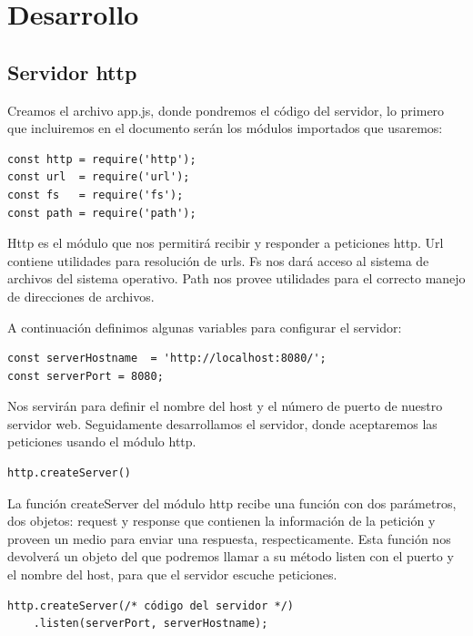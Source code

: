 \documentclass[11pt]{article}
\begin{document}
\section{Desarrollo}
\label{sec:org5755675}

\subsection{Servidor http}
\label{sec:orgc8b7765}
Creamos el archivo app.js, donde pondremos el código del servidor,
lo primero que incluiremos en el documento serán los módulos importados que usaremos:

\begin{verbatim}
const http = require('http');
const url  = require('url');
const fs   = require('fs');
const path = require('path');
\end{verbatim}

Http es el módulo que nos permitirá recibir y responder a peticiones http.
Url contiene utilidades para resolución de urls.
Fs nos dará acceso al sistema de archivos del sistema operativo.
Path nos provee utilidades para el correcto manejo de direcciones de archivos.

A continuación definimos algunas variables para configurar el servidor:

\begin{verbatim}
const serverHostname  = 'http://localhost:8080/';
const serverPort = 8080;
\end{verbatim}

Nos servirán para definir el nombre del host y el número de puerto de nuestro servidor web.
Seguidamente desarrollamos el servidor, donde aceptaremos las peticiones usando el módulo http.

\begin{verbatim}
http.createServer()
\end{verbatim}

La función createServer del módulo http recibe una función con dos parámetros,
dos objetos: request y response que contienen la información de la petición
y proveen un medio para enviar una respuesta, respecticamente.
Esta función nos devolverá un objeto del que podremos llamar a su método listen con el puerto y el nombre del host,
para que el servidor escuche peticiones.

\begin{verbatim}
http.createServer(/* código del servidor */)
    .listen(serverPort, serverHostname);
\end{verbatim}
\end{document}
